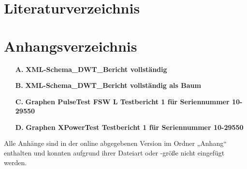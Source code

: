 \documentclass[
pagesize,				%
a4paper,				%
oneside,				%
headsepline,		    %
11pt,					%
halfparskip,		    %
final,					%
listof=totoc           %
]{scrartcl}			    %
\begin{document}


\newpage
\renewcommand{\thesection}{\roman{section}}
\ohead[\pagemark]{}
\setcounter{section}{0}
\newpage
\section{Literaturverzeichnis}
\label{sec:literaturverzeichnis}
\printbibliography
\newpage
\section{Anhangsverzeichnis}
\label{sec:anhangsverzeichnis}

\begin{itemize}
  \item[\textbf{A.}] \textbf{XML-Schema\_DWT\_Bericht vollständig} \label{anh:xsd}
  \item[\textbf{B.}] \textbf{XML-Schema\_DWT\_Bericht vollständig als Baum} \label{anh:xsdbaum}
  \item[\textbf{C.}] \textbf{Graphen PulseTest FSW L Testbericht 1 für Seriennummer 10-29550} \label{anh:gPulse}
  \item[\textbf{D.}] \textbf{Graphen XPowerTest Testbericht 1 für Seriennummer 10-29550} \label{anh:gXpower}
\end{itemize}

Alle Anhänge sind in der online abgegebenen Version im Ordner „Anhang“ enthalten und konnten aufgrund ihrer Dateiart oder -größe nicht eingefügt werden.

\newpage

\end{document}
